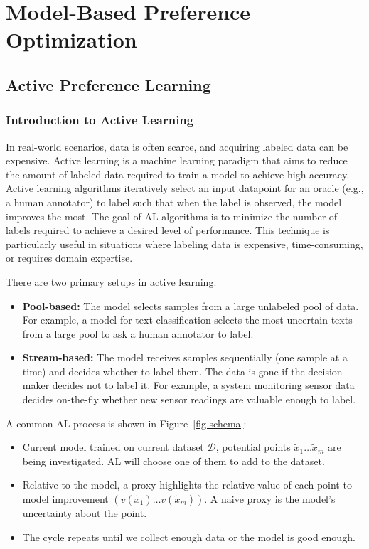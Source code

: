 \documentclass[
  letterpaper,
  numbers=noenddot,
  DIV=11,
  oneside]{scrreprt}
\let\oldchapter\chapter
\def\chapter{%
  \setcounter{sidenote}{1}%
  \oldchapter
}
\theoremstyle{remark}
\begin{document}

\chapter{Model-Based Preference Optimization}\label{ch-model-based}

\section{Active Preference Learning}\label{active-preference-learning}

\subsection{Introduction to Active
Learning}\label{introduction-to-active-learning}

In real-world scenarios, data is often scarce, and acquiring labeled
data can be expensive. Active learning is a machine learning paradigm
that aims to reduce the amount of labeled data required to train a model
to achieve high accuracy. Active learning algorithms iteratively select
an input datapoint for an oracle (e.g., a human annotator) to label such
that when the label is observed, the model improves the most. The goal
of AL algorithms is to minimize the number of labels required to achieve
a desired level of performance. This technique is particularly useful in
situations where labeling data is expensive, time-consuming, or requires
domain expertise.

There are two primary setups in active learning:

\begin{itemize}
\item
  \textbf{Pool-based:} The model selects samples from a large unlabeled
  pool of data. For example, a model for text classification selects the
  most uncertain texts from a large pool to ask a human annotator to
  label.
\item
  \textbf{Stream-based:} The model receives samples sequentially (one
  sample at a time) and decides whether to label them. The data is gone
  if the decision maker decides not to label it. For example, a system
  monitoring sensor data decides on-the-fly whether new sensor readings
  are valuable enough to label.
\end{itemize}

A common AL process is shown in Figure~\ref{fig-schema}:

\begin{itemize}
\item
  Current model trained on current dataset \(\mathcal{D}\), potential
  points \(\tilde{x}_1 \dots \tilde{x}_m\) are being investigated. AL
  will choose one of them to add to the dataset.
\item
  Relative to the model, a proxy highlights the relative value of each
  point to model improvement \((v(\tilde{x}_1) \dots v(\tilde{x}_m) )\).
  A naive proxy is the model's uncertainty about the point.
\item
  The cycle repeats until we collect enough data or the model is good
  enough.
\end{itemize}
\end{document}
